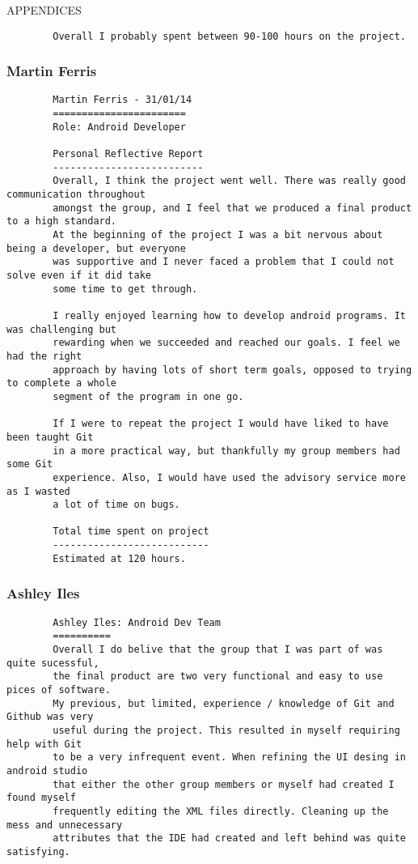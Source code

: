 \documentclass{article}
\begin{document}
\begin{section}{APPENDICES}
\begin{verbatim}
		Overall I probably spent between 90-100 hours on the project.
		\end{verbatim}
		
		\clearpage
		\subsubsection{Martin Ferris}
		\begin{verbatim}
		Martin Ferris - 31/01/14 
		=======================
		Role: Android Developer

		Personal Reflective Report
		--------------------------
		Overall, I think the project went well. There was really good communication throughout
		amongst the group, and I feel that we produced a final product to a high standard.
		At the beginning of the project I was a bit nervous about being a developer, but everyone
		was supportive and I never faced a problem that I could not solve even if it did take 
		some time to get through.

		I really enjoyed learning how to develop android programs. It was challenging but 
		rewarding when we succeeded and reached our goals. I feel we had the right 
		approach by having lots of short term goals, opposed to trying to complete a whole 
		segment of the program in one go.

		If I were to repeat the project I would have liked to have been taught Git 
		in a more practical way, but thankfully my group members had some Git 
		experience. Also, I would have used the advisory service more as I wasted 
		a lot of time on bugs.

		Total time spent on project
		---------------------------
		Estimated at 120 hours.
		\end{verbatim}
		
		\clearpage
		\subsubsection{Ashley Iles}
		\begin{verbatim}
		Ashley Iles: Android Dev Team
		==========
		Overall I do belive that the group that I was part of was quite sucessful,
		the final product are two very functional and easy to use pices of software.
		My previous, but limited, experience / knowledge of Git and Github was very
		useful during the project. This resulted in myself requiring help with Git
		to be a very infrequent event. When refining the UI desing in android studio
		that either the other group members or myself had created I found myself
		frequently editing the XML files directly. Cleaning up the mess and unnecessary
		attributes that the IDE had created and left behind was quite satisfying.
		

\end{verbatim}
\end{section}
\end{document}
